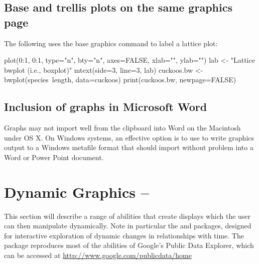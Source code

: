 \subsection*{Base and trellis plots on the same graphics page}

The following uses the base graphics command 
to label a lattice plot:
\begin{Schunk}
\begin{Sinput}
plot(0:1, 0:1, type="n", bty="n", axes=FALSE,
     xlab="", ylab="")
lab <- "Lattice bwplot (i.e., boxplot)"
mtext(side=3, line=3, lab)
cuckoos.bw <- bwplot(species~length, data=cuckoos)
print(cuckoos.bw, newpage=FALSE)
\end{Sinput}
\end{Schunk}

\subsection*{Inclusion of graphs in Microsoft Word}

Graphs may not import well from the clipboard into Word on the
Macintosh under OS X.  On Windows systems, an effective option is to
use  to write graphics output to a Windows
metafile format that should import without problem into a Word or
Power Point document.


\section{Dynamic Graphics -- }\label{sec:dynamicg}

This section will describe a range of abilities that create displays
which the user can then manipulate dynamically.  Note in particular
the  and  packages, designed for interactive
exploration of dynamic changes in relationships with time.  The 
 package reproduces most of the abilities of Google's
Public Data Explorer, which can be accessed at
\url{http://www.google.com/publicdata/home}



